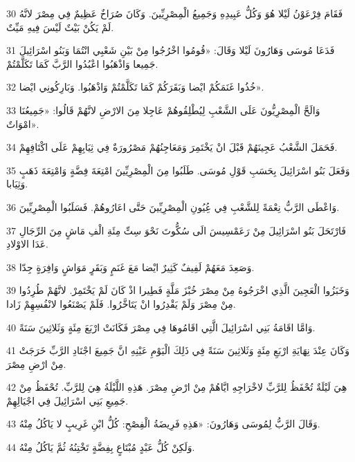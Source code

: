 \par 30 فَقَامَ فِرْعَوْنُ لَيْلا هُوَ وَكُلُّ عَبِيدِهِ وَجَمِيعُ الْمِصْرِيِّينَ. وَكَانَ صُرَاخٌ عَظِيمٌ فِي مِصْرَ لانَّهُ لَمْ يَكُنْ بَيْتٌ لَيْسَ فِيهِ مَيِّتٌ.
\par 31 فَدَعَا مُوسَى وَهَارُونَ لَيْلا وَقَالَ: «قُومُوا اخْرُجُوا مِنْ بَيْنِ شَعْبِي انْتُمَا وَبَنُو اسْرَائِيلَ جَمِيعا وَاذْهَبُوا اعْبُدُوا الرَّبَّ كَمَا تَكَلَّمْتُمْ.
\par 32 خُذُوا غَنَمَكُمْ ايْضا وَبَقَرَكُمْ كَمَا تَكَلَّمْتُمْ وَاذْهَبُوا. وَبَارِكُونِي ايْضا».
\par 33 وَالَحَّ الْمِصْرِيُّونَ عَلَى الشَّعْبِ لِيُطْلِقُوهُمْ عَاجِلا مِنَ الارْضِ لانَّهُمْ قَالُوا: «جَمِيعُنَا امْوَاتٌ».
\par 34 فَحَمَلَ الشَّعْبُ عَجِينَهُمْ قَبْلَ انْ يَخْتَمِرَ وَمَعَاجِنُهُمْ مَصْرُورَةٌ فِي ثِيَابِهِمْ عَلَى اكْتَافِهِمْ.
\par 35 وَفَعَلَ بَنُو اسْرَائِيلَ بِحَسَبِ قَوْلِ مُوسَى. طَلَبُوا مِنَ الْمِصْرِيِّينَ امْتِعَةَ فِضَّةٍ وَامْتِعَةَ ذَهَبٍ وَثِيَابا.
\par 36 وَاعْطَى الرَّبُّ نِعْمَةً لِلشَّعْبِ فِي عُِيُونِ الْمِصْرِيِّينَ حَتَّى اعَارُوهُمْ. فَسَلَبُوا الْمِصْرِيِّينَ.
\par 37 فَارْتَحَلَ بَنُو اسْرَائِيلَ مِنْ رَعَمْسِيسَ الَى سُكُّوتَ نَحْوَ سِتِّ مِئَةِ الْفِ مَاشٍ مِنَ الرِّجَالِ عَدَا الاوْلادِ.
\par 38 وَصَعِدَ مَعَهُمْ لَفِيفٌ كَثِيرٌ ايْضا مَعَ غَنَمٍ وَبَقَرٍ مَوَاشٍ وَافِرَةٍ جِدّا.
\par 39 وَخَبَزُوا الْعَجِينَ الَّذِي اخْرَجُوهُ مِنْ مِصْرَ خُبْزَ مَلَّةٍ فَطِيرا اذْ كَانَ لَمْ يَخْتَمِرْ. لانَّهُمْ طُرِدُوا مِنْ مِصْرَ وَلَمْ يَقْدِرُوا انْ يَتَاخَّرُوا. فَلَمْ يَصْنَعُوا لانْفُسِهِمْ زَادا.
\par 40 وَامَّا اقَامَةُ بَنِي اسْرَائِيلَ الَّتِي اقَامُوهَا فِي مِصْرَ فَكَانَتْ ارْبَعَ مِئَةٍ وَثَلاثِينَ سَنَةً.
\par 41 وَكَانَ عِنْدَ نِهَايَةِ ارْبَعِ مِئَةٍ وَثَلاثِينَ سَنَةً فِي ذَلِكَ الْيَوْمِ عَيْنِهِ انَّ جَمِيعَ اجْنَادِ الرَّبِّ خَرَجَتْ مِنْ ارْضِ مِصْرَ.
\par 42 هِيَ لَيْلَةٌ تُحْفَظُ لِلرَّبِّ لاخْرَاجِهِ ايَّاهُمْ مِنْ ارْضِ مِصْرَ. هَذِهِ اللَّيْلَةُ هِيَ لِلرَّبِّ. تُحْفَظُ مِنْ جَمِيعِ بَنِي اسْرَائِيلَ فِي اجْيَالِهِمْ.
\par 43 وَقَالَ الرَّبُّ لِمُوسَى وَهَارُونَ: «هَذِهِ فَرِيضَةُ الْفِصْحِ: كُلُّ ابْنِ غَرِيبٍ لا يَاكُلُ مِنْهُ.
\par 44 وَلَكِنْ كُلُّ عَبْدٍ مُبْتَاعٍ بِفِضَّةٍ تَخْتِنُهُ ثُمَّ يَاكُلُ مِنْهُ.
